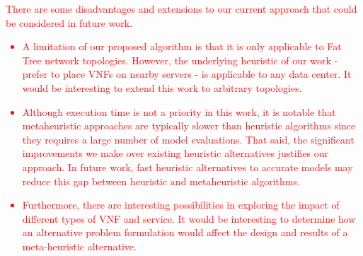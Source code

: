 \textcolor{red}{
There are some disadvantages and extensions to our current approach that could be considered in future work.
\begin{itemize}
    \item A limitation of our proposed algorithm is that it is only applicable to Fat Tree network topologies. However, the underlying heuristic of our work - prefer to place VNFs on nearby servers - is applicable to any data center. It would be interesting to extend this work to arbitrary topologies.
    \item Although execution time is not a priority in this work, it is notable that metaheuristic approaches are typically slower than heuristic algorithms since they requires a large number of model evaluations. That said, the significant improvements we make over existing heuristic alternatives justifies our approach. In future work, fast heuristic alternatives to accurate models may reduce this gap between heuristic and metaheuristic algorithms.
    \item Furthermore, there are interesting possibilities in exploring the impact of different types of VNF and service. It would be interesting to determine how an alternative problem formulation would affect the design and results of a meta-heuristic alternative.
\end{itemize}
}